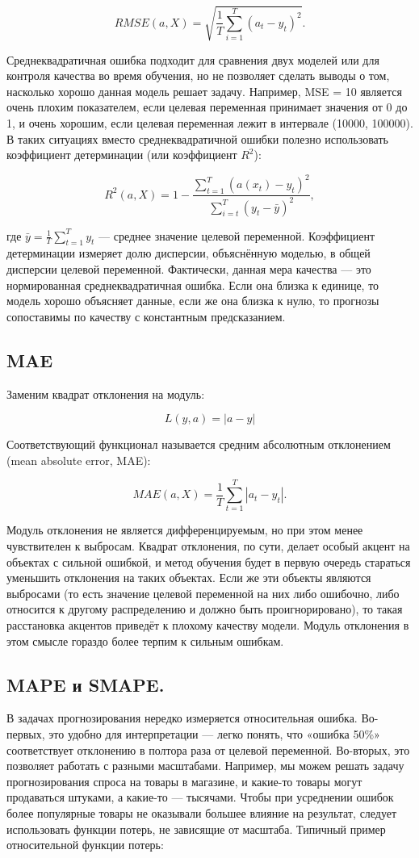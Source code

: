 \[
  RMSE(a, X) = \sqrt{\frac{1}{T} \sum_{i=1}^{T} (a_t - y_t)^2}.
\]

Среднеквадратичная ошибка подходит для сравнения двух моделей или для
контроля качества во время обучения, но не позволяет сделать выводы о
том, насколько хорошо данная модель решает задачу. Например, MSE = 10
является очень плохим показателем, если целевая переменная принимает
значения от 0 до 1, и очень хорошим, если целевая переменная лежит в
интервале (10000, 100000). В таких ситуациях вместо
среднеквадратичной ошибки полезно использовать коэффициент
детерминации (или коэффициент $R^2$):

\[
  R^2(a, X) = 1 - \frac{\sum_{t=1}^{T} (a(x_t) -
  y_t)^2}{\sum_{i=t}^{T} (y_t - \bar{y})^2},
\]

где $\bar{y} = \frac{1}{T} \sum_{t=1}^{T} y_t$ — среднее значение
целевой переменной. Коэффициент детерминации измеряет долю дисперсии,
объяснённую моделью, в общей дисперсии целевой переменной.
Фактически, данная мера качества — это нормированная
среднеквадратичная ошибка. Если она близка к единице, то модель
хорошо объясняет данные, если же она близка к нулю, то прогнозы
сопоставимы по качеству с константным предсказанием.

\subsection*{MAE}
Заменим квадрат отклонения на модуль:

\[
  L(y, a) = |a - y|
\]

Соответствующий функционал называется средним абсолютным отклонением
(mean absolute error, MAE):

\[
  MAE(a, X) = \frac{1}{T} \sum_{t=1}^{T} |a_t - y_t|.
\]

Модуль отклонения не является дифференцируемым, но при этом менее
чувствителен к выбросам. Квадрат отклонения, по сути, делает особый
акцент на объектах с сильной ошибкой, и метод обучения будет в первую
очередь стараться уменьшить отклонения на таких объектах. Если же эти
объекты являются выбросами (то есть значение целевой переменной на
  них либо ошибочно, либо относится к другому распределению и должно
быть проигнорировано), то такая расстановка акцентов приведёт к
плохому качеству модели. Модуль отклонения в этом смысле гораздо
более терпим к сильным ошибкам.

\subsection*{MAPE и SMAPE.}
В задачах прогнозирования нередко измеряется
относительная ошибка. Во-первых, это удобно для интерпретации — легко
понять, что «ошибка 50\%» соответствует отклонению в полтора раза от
целевой переменной. Во-вторых, это позволяет работать с разными
масштабами. Например, мы можем решать задачу прогнозирования спроса
на товары в магазине, и какие-то товары могут продаваться штуками, а
какие-то — тысячами. Чтобы при усреднении ошибок более популярные
товары не оказывали большее влияние на результат, следует
использовать функции потерь, не зависящие от масштаба. Типичный
пример относительной функции потерь:

